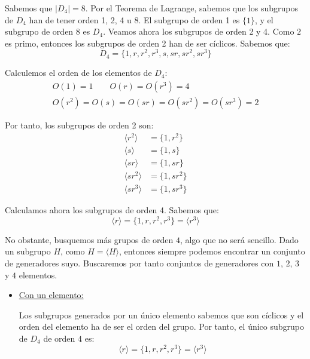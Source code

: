 \begin{ejercicio}
\begin{enumerate}
        Sabemos que $|D_4|=8$. Por el Teorema de Lagrange, sabemos que los subgrupos de $D_4$ han de tener orden 1, 2, 4 u 8. El subgrupo de orden 1 es $\{1\}$, y el subgrupo de orden 8 es $D_4$. Veamos ahora los subgrupos de orden 2 y 4. Como $2$ es primo, entonces los subgrupos de orden 2 han de ser cíclicos. Sabemos que:
        \begin{equation*}
            D_4=\{1,r,r^2,r^3,s,sr,sr^2,sr^3\}
        \end{equation*}

        Calculemos el orden de los elementos de $D_4$:
        \begin{gather*}
            O(1) =1\qquad O(r)=O(r^3)=4\\
            O(r^2)=O(s)=O(sr)=O(sr^2)=O(sr^3)=2
        \end{gather*}

        Por tanto, los subgrupos de orden 2 son:
        \begin{align*}
            \langle r^2\rangle &= \{1,r^2\}\\
            \langle s\rangle &= \{1,s\}\\
            \langle sr\rangle &= \{1,sr\}\\
            \langle sr^2\rangle &= \{1,sr^2\}\\
            \langle sr^3\rangle &= \{1,sr^3\}
        \end{align*}

        Calculamos ahora los subgrupos de orden 4. Sabemos que:
        \begin{equation*}
            \langle r\rangle = \{1,r,r^2,r^3\}=\langle r^3\rangle
        \end{equation*}

        No obstante, busquemos más grupos de orden $4$, algo que no será sencillo.
        Dado un subgrupo $H$, como $H=\langle H\rangle$, entonces siempre podemos encontrar un conjunto de generadores suyo. Buscaremos por tanto conjuntos de generadores con $1$, $2$, $3$ y $4$ elementos.
        \begin{itemize}
            \item \ul{Con un elemento:}
            
            Los subgrupos generados por un único elemento sabemos que son cíclicos y el orden del elemento ha de ser el orden del grupo. Por tanto, el único subgrupo de $D_4$ de orden $4$ es:
            \begin{equation*}
                \langle r\rangle = \{1,r,r^2,r^3\} = \langle r^3\rangle
            \end{equation*}


\end{itemize}
\end{enumerate}
\end{ejercicio}
